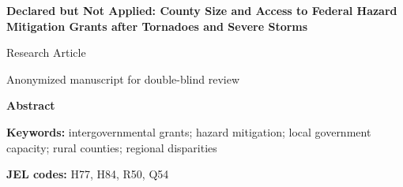 \documentclass[12pt]{article}
\begin{document}
\thispagestyle{empty}
\begin{center}
\vspace*{1.2in}
{\Large\bfseries Declared but Not Applied: County Size and Access to Federal Hazard Mitigation Grants after Tornadoes and Severe Storms\par}
\vspace{0.4in}
{\normalsize Research Article\par}
\vspace{0.2in}
{\small Anonymized manuscript for double-blind review\par}
\end{center}
\clearpage

\begin{onehalfspacing}
\noindent\textbf{Abstract}\par\smallskip
\noindent 

\bigskip
\noindent\textbf{Keywords:} intergovernmental grants; hazard mitigation; local government capacity; rural counties; regional disparities

\smallskip
\noindent\textbf{JEL codes:} H77, H84, R50, Q54
\end{onehalfspacing}
\clearpage

\doublespacing
\linenumbers








\clearpage
\nolinenumbers
\singlespacing
\printbibliography[title={References}]

\clearpage

\clearpage

\clearpage

\clearpage

\clearpage


\clearpage


\clearpage

\end{document}
